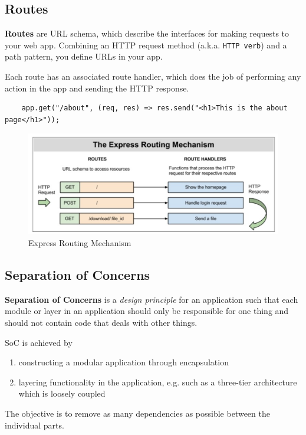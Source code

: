 \subsection{Routes}
\textbf{Routes}  are URL schema, which describe the interfaces for making requests to your web app. Combining an HTTP request method (a.k.a. \texttt{HTTP verb}) and a path pattern, you define URLs in your app.

Each route has an associated route handler, which does the job of performing any action in the app and sending the HTTP response.

\begin{verbatim}
	app.get("/about", (req, res) => res.send("<h1>This is the about page</h1>")); 
\end{verbatim}

\begin{figure}[H]
	\centering
	\includegraphics[width=\textwidth]{routing.png}
	\caption{Express Routing Mechanism}
	\label{fig:routing}
\end{figure}
\subsection{Separation of Concerns}
\textbf{Separation of Concerns} is a \emph{design principle} for an application such that each module or layer in an application should only be responsible for one thing and should not contain code that deals with other things.

SoC is achieved by 
\begin{enumerate}
	\item constructing a modular application through encapsulation
	\item layering functionality in the application, e.g. such as a three-tier architecture which is loosely coupled
\end{enumerate}

The objective is to remove as many dependencies as possible between the individual parts.

